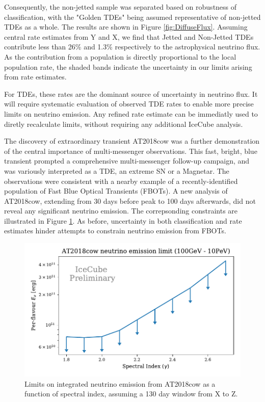 \documentclass[]{article}
\begin{document}
	Consequently, the non-jetted sample was separated based on robustness of classification, with the "Golden TDEs" being assumed representative of non-jetted TDEs as a whole. The results are shown in Figure \ref{fig:DiffuseFlux}. Assuming central rate estimates from Y and X, we find that Jetted and Non-Jetted TDEs contribute less than 26\% and 1.3\% respectively to the astrophysical neutrino flux. As the contribution from a population is directly proportional to the local population rate, the shaded bands indicate the uncertainty in our limits arising from rate estimates.
	
	For TDEs, these rates are the dominant source of uncertainty in neutrino flux. It will require systematic evaluation of observed TDE rates to enable more precise limits on neutrino emission. Any refined rate estimate can be immediatly used to diretly recalculate  limits, without requiring any additional IceCube analysis.
	
	The discovery of extraordinary transient AT2018cow was a further demonstration of the central importance of multi-messenger observations.  This fast, bright, blue transient prompted a comprehensive multi-messenger follow-up campaign, and was variously interpreted as a TDE, an extreme SN or a Magnetar. The observations were consistent with a nearby example of a recently-identified population of Fast Blue Optical Transients (FBOTs). A new analysis of AT2018cow, extending from 30 days before peak to 100 days afterwards, did not reveal any significant neutrino emission. The correpsonding constraints are illustrated in Figure \ref{fig:At2018cow}. As before, uncertainty in both classification and rate estimates hinder attempts to constrain neutrino emission from FBOTs.
	
	\begin{figure}[!ht]
		\centering \includegraphics[width=\textwidth]{figures/AT2018cow_limit_plot}
		\caption{Limits on integrated neutrino emission from AT2018cow as a function of spectral index, assuming a 130 day window from X to Z.}
		\label{fig:At2018cow}
	\end{figure}
	
\end{document}
